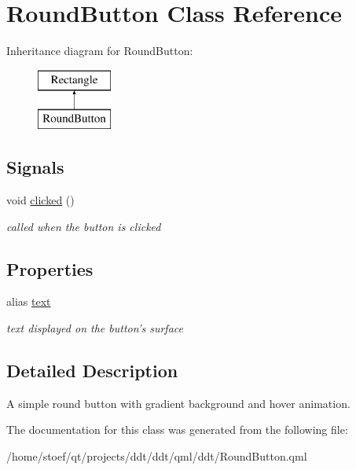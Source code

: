 \hypertarget{classRoundButton}{\section{Round\-Button Class Reference}
\label{classRoundButton}
}
Inheritance diagram for Round\-Button\-:\begin{figure}[H]
\begin{center}
\leavevmode
\includegraphics[height=2.000000cm]{classRoundButton}
\end{center}
\end{figure}
\subsection*{Signals}
\begin{DoxyCompactItemize}
\item 
\hypertarget{classRoundButton_a0b3ac16502895acc5a51d45aef7a19c2}{void \hyperlink{classRoundButton_a0b3ac16502895acc5a51d45aef7a19c2}{clicked} ()}\label{classRoundButton_a0b3ac16502895acc5a51d45aef7a19c2}

\begin{DoxyCompactList}\small\item\em called when the button is clicked \end{DoxyCompactList}\end{DoxyCompactItemize}
\subsection*{Properties}
\begin{DoxyCompactItemize}
\item 
\hypertarget{classRoundButton_a48b76509d0dabcddc89591eb0f3d1991}{alias \hyperlink{classRoundButton_a48b76509d0dabcddc89591eb0f3d1991}{text}}\label{classRoundButton_a48b76509d0dabcddc89591eb0f3d1991}

\begin{DoxyCompactList}\small\item\em text displayed on the button's surface \end{DoxyCompactList}\end{DoxyCompactItemize}


\subsection{Detailed Description}
A simple round button with gradient background and hover animation. 

The documentation for this class was generated from the following file\-:\begin{DoxyCompactItemize}
\item 
/home/stoef/qt/projects/ddt/ddt/qml/ddt/Round\-Button.\-qml\end{DoxyCompactItemize}
